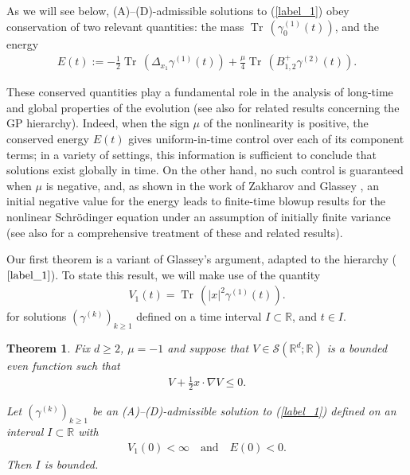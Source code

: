 \documentclass[reqno]{amsart}
\numberwithin{equation}{section}
\newtheorem{theorem}{Theorem}[section]
\theoremstyle{remark}
\DeclareMathOperator{\Tr}{Tr\,}
\begin{document}
\vspace{0.2in}

As we will see below, (A)--(D)-admissible solutions to (\ref{label_1}) obey conservation of two relevant quantities: the mass $\Tr(\gamma_0^{(1)}(t))$, and the energy
\begin{align}
E(t):=-\frac{1}{2}\Tr(\Delta_{x_1}\gamma^{(1)}(t))+\frac{\mu}{4}\Tr(B_{1,2}^+\gamma^{(2)}(t)).\label{label_4}
\end{align}

These conserved quantities play a fundamental role in the analysis of long-time and global properties of the evolution (see also \cite{CPT,CPHigher} for related results concerning the GP hierarchy).  Indeed, when the sign $\mu$ of the nonlinearity is positive, the conserved energy $E(t)$ gives uniform-in-time control over each of its component terms; in a variety of settings, this information is sufficient to conclude that solutions exist globally in time.  On the other hand, no such control is guaranteed when $\mu$ is negative, and, as shown in the work of Zakharov \cite{Z} and Glassey \cite{G}, an initial negative value for the energy leads to finite-time blowup results for the nonlinear Schr\"odinger equation under an assumption of initially finite variance (see also \cite{C} for a comprehensive treatment of these and related results).  

\vspace{0.2in}

Our first theorem is a variant of Glassey's argument, adapted to the hierarchy ($\ref{label_1}$).  To state this result, we will make use of the quantity
\begin{align*}
V_1(t)=\Tr(|x|^2\gamma^{(1)}(t)).
\end{align*}
for solutions $(\gamma^{(k)})_{k\geq 1}$ defined on a time interval $I\subset\mathbb{R}$, and $t\in I$.

\begin{theorem}
\label{label_5}
Fix $d\geq 2$, $\mu=-1$ and suppose that $V\in\mathcal{S}(\mathbb{R}^d;\mathbb{R})$ is a bounded even function such that
\begin{align*}
V+\frac{1}{2}x\cdot \nabla V\leq 0.
\end{align*}

Let $(\gamma^{(k)})_{k\geq 1}$ be an (A)--(D)-admissible solution to (\ref{label_1}) defined on an interval $I\subset\mathbb{R}$ with
\begin{align*}
V_1(0)<\infty
\quad \textrm{and}\quad E(0)<0.
\end{align*}
Then $I$ is bounded.
\end{theorem}
\end{document}
